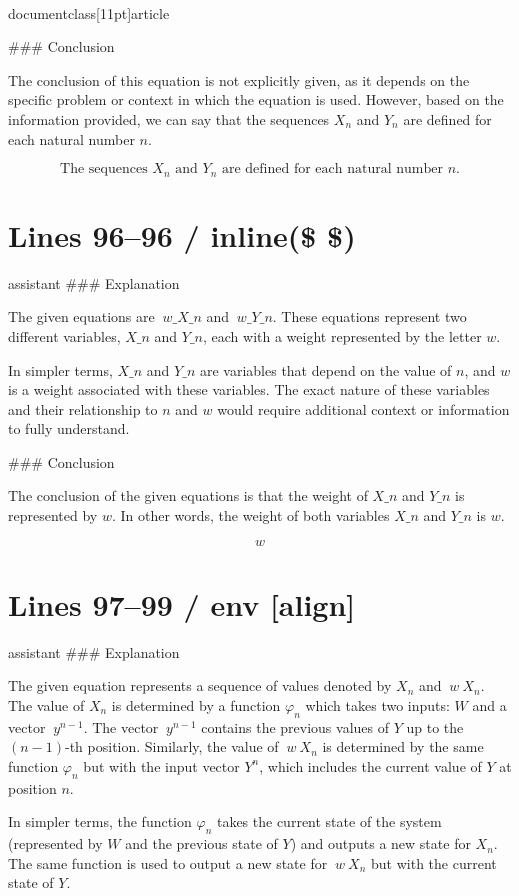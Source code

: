 \\documentclass[11pt]{article}
\begin{document}
### Conclusion

The conclusion of this equation is not explicitly given, as it depends on the specific problem or context in which the equation is used. However, based on the information provided, we can say that the sequences \(X_n\) and \(Y_n\) are defined for each natural number \(n\).

\[
\boxed{\text{The sequences } X_n \text{ and } Y_n \text{ are defined for each natural number } n.}
\]


\section*{Lines 96–96 / inline(\$ \$) }
assistant
### Explanation

The given equations are \(\ w\_{X\_n}\) and \(\ w\_{Y\_n}\). These equations represent two different variables, \(X\_n\) and \(Y\_n\), each with a weight represented by the letter \(w\).

In simpler terms, \(X\_n\) and \(Y\_n\) are variables that depend on the value of \(n\), and \(w\) is a weight associated with these variables. The exact nature of these variables and their relationship to \(n\) and \(w\) would require additional context or information to fully understand.

### Conclusion

The conclusion of the given equations is that the weight of \(X\_n\) and \(Y\_n\) is represented by \(w\). In other words, the weight of both variables \(X\_n\) and \(Y\_n\) is \(w\).

\[
\boxed{w}
\]


\section*{Lines 97–99 / env [align]}
assistant
### Explanation

The given equation represents a sequence of values denoted by \(X_n\) and \(\ w\ X_n\). The value of \(X_n\) is determined by a function \(\varphi_n\) which takes two inputs: \(W\) and a vector \(\ y^{n-1}\). The vector \(\ y^{n-1}\) contains the previous values of \(Y\) up to the \((n-1)\)-th position. Similarly, the value of \(\ w\ X_n\) is determined by the same function \(\varphi_n\) but with the input vector \(Y^n\), which includes the current value of \(Y\) at position \(n\).

In simpler terms, the function \(\varphi_n\) takes the current state of the system (represented by \(W\) and the previous state of \(Y\)) and outputs a new state for \(X_n\). The same function is used to output a new state for \(\ w\ X_n\) but with the current state of \(Y\).
\end{document}
